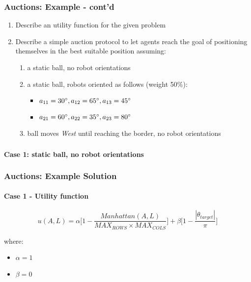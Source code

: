 \begin{frame}
	\frametitle{Auctions: Example - cont'd}
	
	\Large
	
	\begin{enumerate}
		\item Describe an utility function for the given problem
		\item Describe a simple auction protocol to let agents reach the goal of positioning
			  themselves in the best suitable position assuming:
			  
			  \begin{enumerate}
				  \item a static ball, no robot orientations
				  \item a static ball, robots oriented as follows (weight 50\%):
					  \begin{itemize}
						  \item $ a_{11} = 30\degree, a_{12} = 65\degree, a_{13} = 45\degree $
						  \item $ a_{21} = 60\degree, a_{22} = 35\degree, a_{23} = 80\degree $
					  \end{itemize}
				  \item ball moves \emph{West} until reaching the border, no robot orientations
			  \end{enumerate}
	\end{enumerate}
\end{frame}

\begin{frame}
	\frametitle{}
	
	\Large
	
	\vspace{0.7cm}
	
	\begin{center}
		\textbf{Case 1: static ball, no robot orientations}
	\end{center}
\end{frame}

\begin{frame}
	\frametitle{Auctions: Example Solution}
	\framesubtitle{Case 1 - Utility function}
	
	\large
	
	\vspace{0.5cm}
	
	\begin{equation*}
		u(A,L) = \alpha \Big [ 1 - \frac{Manhattan(A,L)}{MAX_{ROWS} \times MAX_{COLS}} \Big ] + \beta \Big [ 1 - \frac{| \theta_{target} |}{\pi} \Big ]
	\end{equation*}
	
	\vspace{0.3cm}
	
	where:
	
	\begin{itemize}
		\item $ \alpha = 1 $
		\item $ \beta = 0 $
	\end{itemize}
\end{frame}

